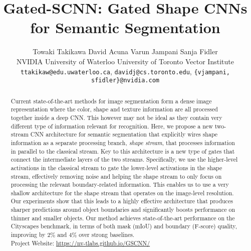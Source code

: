 \documentclass[10pt,twocolumn,letterpaper]{article}
\begin{document}
\title{Gated-SCNN: Gated Shape CNNs for Semantic Segmentation 
}

\author{
    Towaki Takikawa\hspace{1cm}
    David Acuna  \hspace{1cm}
    Varun Jampani  \hspace{1cm}
    Sanja Fidler\\
NVIDIA \hspace{1em} University of Waterloo \hspace{1em}  University of Toronto \hspace{1em}  Vector Institute  \\
{\tt\small ttakikaw@edu.uwaterloo.ca}, {\tt\small davidj@cs.toronto.edu},
{\tt\small \{vjampani, sfidler\}@nvidia.com}
}

\maketitle



\begin{abstract}
    Current state-of-the-art methods for image segmentation form a dense image representation     
    where the color, shape and texture information are 
    all  processed together inside a deep CNN. This however may not be ideal as they contain very different type of information relevant for recognition. 
Here, we propose a new two-stream CNN architecture for semantic segmentation that explicitly wires shape information as a separate processing branch, \ie \emph{shape stream}, that processes information in parallel to the classical stream.  Key to this architecture is a new type of gates that connect the intermediate layers of the two streams. Specifically, we use the higher-level activations in the classical stream to gate the lower-level activations in the shape stream, effectively removing noise and helping the shape stream to only focus on processing the relevant boundary-related information. 
This enables us to use a very shallow architecture for the shape stream that operates on the image-level resolution.
Our experiments show that this leads to a highly effective architecture that produces sharper predictions around object boundaries and significantly boosts performance on thinner and smaller objects. 
    Our method achieves state-of-the-art performance on the Cityscapes benchmark, in terms of both mask (mIoU) and boundary (F-score) quality, improving by 2\% and 4\% over strong baselines. \\\small{Project Website: \href{https://nv-tlabs.github.io/GSCNN/}{https://nv-tlabs.github.io/GSCNN/}}

\end{abstract}
\end{document}
